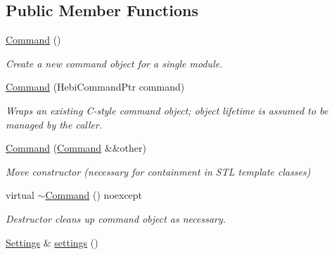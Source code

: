 \subsection*{Public Member Functions}
\begin{DoxyCompactItemize}
\item 
\hyperlink{classhebi_1_1Command_a8d9766d1a77d76854b1964f57f4a8661}{Command} ()\hypertarget{classhebi_1_1Command_a8d9766d1a77d76854b1964f57f4a8661}{}\label{classhebi_1_1Command_a8d9766d1a77d76854b1964f57f4a8661}

\begin{DoxyCompactList}\small\item\em Create a new command object for a single module. \end{DoxyCompactList}\item 
\hyperlink{classhebi_1_1Command_a8f1e2bbe57e74cac0b3a6adf83634308}{Command} (Hebi\+Command\+Ptr command)
\begin{DoxyCompactList}\small\item\em Wraps an existing C-\/style command object; object lifetime is assumed to be managed by the caller. \end{DoxyCompactList}\item 
\hyperlink{classhebi_1_1Command_a08f198d16c0e5c229d86471fadec3049}{Command} (\hyperlink{classhebi_1_1Command}{Command} \&\&other)\hypertarget{classhebi_1_1Command_a08f198d16c0e5c229d86471fadec3049}{}\label{classhebi_1_1Command_a08f198d16c0e5c229d86471fadec3049}

\begin{DoxyCompactList}\small\item\em Move constructor (necessary for containment in S\+TL template classes) \end{DoxyCompactList}\item 
virtual \hyperlink{classhebi_1_1Command_a3e69178a5c04e295f55cca8c90bc58f4}{$\sim$\+Command} () noexcept\hypertarget{classhebi_1_1Command_a3e69178a5c04e295f55cca8c90bc58f4}{}\label{classhebi_1_1Command_a3e69178a5c04e295f55cca8c90bc58f4}

\begin{DoxyCompactList}\small\item\em Destructor cleans up command object as necessary. \end{DoxyCompactList}\item 
\hyperlink{classhebi_1_1Command_1_1Settings}{Settings} \& \hyperlink{classhebi_1_1Command_aab5f37fe874acc28889f148bc985b7a5}{settings} ()\hypertarget{classhebi_1_1Command_aab5f37fe874acc28889f148bc985b7a5}{}\label{classhebi_1_1Command_aab5f37fe874acc28889f148bc985b7a5}


\end{DoxyCompactItemize}
